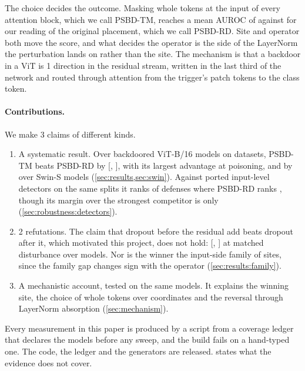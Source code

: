 The choice decides the outcome. Masking whole tokens at the input of every
attention block, which we call PSBD-TM, reaches a mean AUROC of
\HeadlineAurocAdaptive{} against \PublishedAurocAdaptive{} for our reading of the
original placement, which we call PSBD-RD. Site and operator both move the score,
and what decides the operator is the side of the LayerNorm the perturbation lands
on rather than the site. The mechanism is that a backdoor in a ViT is 1 direction
in the residual stream, written in the last third of the network and routed
through attention from the trigger's patch tokens to the class token.

\paragraph{Contributions.} We make 3 claims of different kinds.

\begin{enumerate}
  \item A systematic result. Over \PanelCellsCached{} backdoored ViT-B/16 models on
    \PanelDatasetsCached{} datasets, PSBD-TM beats PSBD-RD by
    \HeadlineGainAdaptiveAuroc{} [\HeadlineGainAdaptiveAurocLow{},
    \HeadlineGainAdaptiveAurocHigh{}], with its largest advantage at \PanelRateLow{}
    poisoning, and by \SwinGainRecommendedMinusPublished{} over \SwinCells{} Swin-S
    models (\cref{sec:results,sec:swin}). Against \DetectorsComparedCount{} ported
    input-level detectors on the same splits it ranks \DetectorsAurocRankOurs{} of
    \DetectorsAurocDefensesRanked{} defenses where PSBD-RD ranks
    \DetectorsAurocRankPublished{}, though its margin over the strongest competitor is
    only \DetectorsAurocMargin{} (\cref{sec:robustness:detectors}).
  \item 2 refutations. The claim that dropout before the residual add beats
    dropout after it, which motivated this project, does not hold:
    \PreMinusPostMatched{} [\PreMinusPostMatchedLow{},
    \PreMinusPostMatchedHigh{}] at matched disturbance over \PreMinusPostN{}
    models. Nor is the winner the input-side family of sites, since the family
    gap changes sign with the operator (\cref{sec:results:family}).
  \item A mechanistic account, tested on the same models. It explains the winning
    site, the choice of whole tokens over coordinates and the reversal through
    LayerNorm absorption (\cref{sec:mechanism}).
\end{enumerate}

Every measurement in this paper is produced by a script from a coverage ledger
that declares the models before any sweep, and the build fails on a hand-typed one.
The code, the ledger and the generators are released.  states
what the evidence does not cover.
